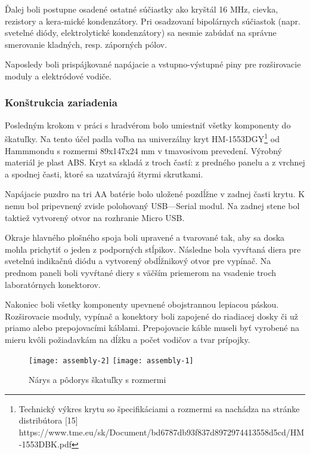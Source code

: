 \documentclass[titlepage,12pt]{article}
\begin{document}
Ďalej boli postupne osadené ostatné súčiastky ako kryštál 16 MHz, cievka, rezistory a kera-mické kondenzátory. Pri osadzovaní bipolárnych súčiastok (napr. svetelné diódy, elektrolytické kondenzátory) sa nesmie zabúdať na správne smerovanie kladných, resp. záporných pólov.

Naposledy boli prispájkované napájacie a vstupno-výstupné piny pre rozširovacie moduly \linebreak a elektródové vodiče.

\newpage
\subsubsection{Konštrukcia zariadenia}
Posledným krokom v práci s hradvérom bolo umiestniť všetky komponenty do škatuľky. Na tento účel padla voľba na univerzálny kryt HM-1553DGY\footnote{Technický výkres krytu so špecifikáciami a rozmermi sa nachádza na stránke distribútora [15] \\ https://www.tme.eu/sk/Document/bd6787db93f837d8972974413558d5cd/HM-1553DBK.pdf} od Hammmondu s rozmermi \linebreak 89x147x24 mm v tmavosivom prevedení. Výrobný materiál je plast ABS. Kryt sa skladá \linebreak z troch častí: z predného panelu a z vrchnej a spodnej časti, ktoré sa uzatvárajú štyrmi skrutkami. 

Napájacie puzdro na tri AA batérie bolo uložené pozdĺžne v zadnej časti krytu. K nemu bol pripevnený zvisle polohovaný USB—Serial modul. Na zadnej stene bol taktiež vytvorený otvor na rozhranie Micro USB.

Okraje hlavného plošného spoja boli upravené a tvarované tak, aby sa doska mohla prichytiť o jeden z podporných stĺpikov. Následne bola vyvŕtaná diera pre svetelnú indikačnú diódu \linebreak a vytvorený obdĺžnikový otvor pre vypínač. Na prednom paneli boli vyvŕtané diery s väčším priemerom na vsadenie troch laboratórnych konektorov.

Nakoniec boli všetky komponenty upevnené obojstrannou lepiacou páskou. Rozširovacie moduly, vypínač a konektory boli zapojené do riadiacej dosky či už priamo alebo prepojovacími káblami. Prepojovacie káble museli byť vyrobené na mieru kvôli požiadavkám na dĺžku a počet vodičov a tvar prípojky.


\begin{figure}[!ht]
\begin{center}
\texttt{[image: assembly-2]}
\texttt{[image: assembly-1]}
\caption{Nárys a pôdorys škatuľky s rozmermi}
\end{center}
\end{figure}
\end{document}
